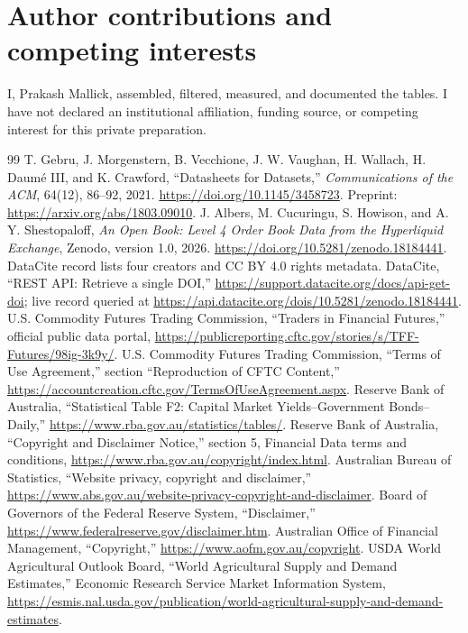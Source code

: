 \documentclass[10pt]{article}
\begin{document}
\section*{Author contributions and competing interests}
I, Prakash Mallick, assembled, filtered, measured, and documented the tables. I have not declared an institutional affiliation, funding source, or competing interest for this private preparation.

\begin{thebibliography}{99}
 T. Gebru, J. Morgenstern, B. Vecchione, J. W. Vaughan, H. Wallach, H. Daum\'{e} III, and K. Crawford, ``Datasheets for Datasets,'' \emph{Communications of the ACM}, 64(12), 86--92, 2021. \url{https://doi.org/10.1145/3458723}. Preprint: \url{https://arxiv.org/abs/1803.09010}.
 J. Albers, M. Cucuringu, S. Howison, and A. Y. Shestopaloff, \emph{An Open Book: Level 4 Order Book Data from the Hyperliquid Exchange}, Zenodo, version 1.0, 2026. \url{https://doi.org/10.5281/zenodo.18184441}. DataCite record lists four creators and CC BY 4.0 rights metadata.
 DataCite, ``REST API: Retrieve a single DOI,'' \url{https://support.datacite.org/docs/api-get-doi}; live record queried at \url{https://api.datacite.org/dois/10.5281/zenodo.18184441}.
 U.S. Commodity Futures Trading Commission, ``Traders in Financial Futures,'' official public data portal, \url{https://publicreporting.cftc.gov/stories/s/TFF-Futures/98ig-3k9y/}.
 U.S. Commodity Futures Trading Commission, ``Terms of Use Agreement,'' section ``Reproduction of CFTC Content,'' \url{https://accountcreation.cftc.gov/TermsOfUseAgreement.aspx}.
 Reserve Bank of Australia, ``Statistical Table F2: Capital Market Yields--Government Bonds--Daily,'' \url{https://www.rba.gov.au/statistics/tables/}.
 Reserve Bank of Australia, ``Copyright and Disclaimer Notice,'' section 5, Financial Data terms and conditions, \url{https://www.rba.gov.au/copyright/index.html}.
 Australian Bureau of Statistics, ``Website privacy, copyright and disclaimer,'' \url{https://www.abs.gov.au/website-privacy-copyright-and-disclaimer}.
 Board of Governors of the Federal Reserve System, ``Disclaimer,'' \url{https://www.federalreserve.gov/disclaimer.htm}.
 Australian Office of Financial Management, ``Copyright,'' \url{https://www.aofm.gov.au/copyright}.
 USDA World Agricultural Outlook Board, ``World Agricultural Supply and Demand Estimates,'' Economic Research Service Market Information System, \url{https://esmis.nal.usda.gov/publication/world-agricultural-supply-and-demand-estimates}.

\end{thebibliography}
\end{document}
